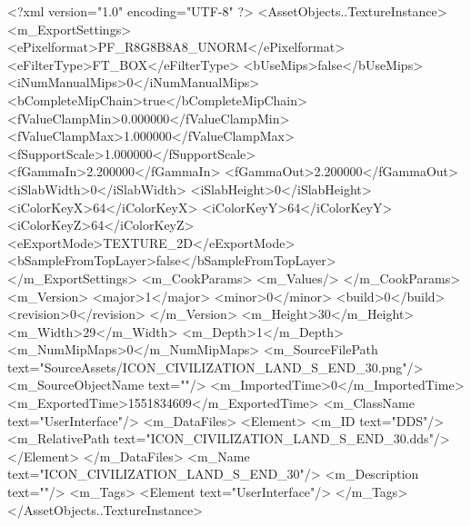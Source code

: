 <?xml version="1.0" encoding="UTF-8" ?>
<AssetObjects..TextureInstance>
	<m_ExportSettings>
		<ePixelformat>PF_R8G8B8A8_UNORM</ePixelformat>
		<eFilterType>FT_BOX</eFilterType>
		<bUseMips>false</bUseMips>
		<iNumManualMips>0</iNumManualMips>
		<bCompleteMipChain>true</bCompleteMipChain>
		<fValueClampMin>0.000000</fValueClampMin>
		<fValueClampMax>1.000000</fValueClampMax>
		<fSupportScale>1.000000</fSupportScale>
		<fGammaIn>2.200000</fGammaIn>
		<fGammaOut>2.200000</fGammaOut>
		<iSlabWidth>0</iSlabWidth>
		<iSlabHeight>0</iSlabHeight>
		<iColorKeyX>64</iColorKeyX>
		<iColorKeyY>64</iColorKeyY>
		<iColorKeyZ>64</iColorKeyZ>
		<eExportMode>TEXTURE_2D</eExportMode>
		<bSampleFromTopLayer>false</bSampleFromTopLayer>
	</m_ExportSettings>
	<m_CookParams>
		<m_Values/>
	</m_CookParams>
	<m_Version>
		<major>1</major>
		<minor>0</minor>
		<build>0</build>
		<revision>0</revision>
	</m_Version>
	<m_Height>30</m_Height>
	<m_Width>29</m_Width>
	<m_Depth>1</m_Depth>
	<m_NumMipMaps>0</m_NumMipMaps>
	<m_SourceFilePath text="SourceAssets/ICON_CIVILIZATION_LAND_S_END_30.png"/>
	<m_SourceObjectName text=""/>
	<m_ImportedTime>0</m_ImportedTime>
	<m_ExportedTime>1551834609</m_ExportedTime>
	<m_ClassName text="UserInterface"/>
	<m_DataFiles>
		<Element>
			<m_ID text="DDS"/>
			<m_RelativePath text="ICON_CIVILIZATION_LAND_S_END_30.dds"/>
		</Element>
	</m_DataFiles>
	<m_Name text="ICON_CIVILIZATION_LAND_S_END_30"/>
	<m_Description text=""/>
	<m_Tags>
		<Element text="UserInterface"/>
	</m_Tags>
</AssetObjects..TextureInstance>

